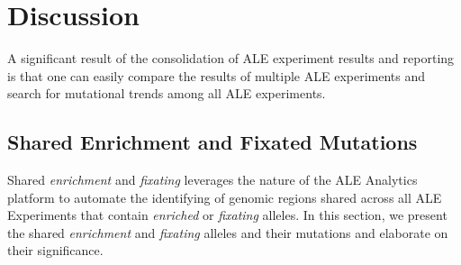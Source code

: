 \documentclass[12pt,final,masters,chapterheads]{ucsd}  %
\begin{document}
\chapter{Discussion}

%
%

%
%
%
%

%
%

%
%

A significant result of the consolidation of ALE experiment results and reporting is that one can easily compare the results of multiple ALE experiments and search for mutational trends among all ALE experiments.

\section{Shared Enrichment and Fixated Mutations}
Shared \textit{enrichment} and \textit{fixating} leverages the nature of the ALE Analytics platform to automate the identifying of genomic regions shared across all ALE Experiments that contain \textit{enriched} or \textit{fixating} alleles. In this section, we present the shared \textit{enrichment} and \textit{fixating} alleles and their mutations and elaborate on their significance.
\end{document}
